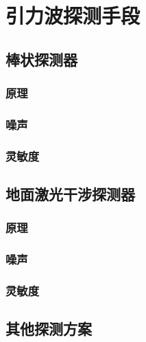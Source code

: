 
\chapter{引力波探测手段}
\label{chap3}

\section{棒状探测器}
\subsection{原理}

\subsection{噪声}

\subsection{灵敏度}


\section{地面激光干涉探测器}
\subsection{原理}

\subsection{噪声}

\subsection{灵敏度}

\section{其他探测方案}
